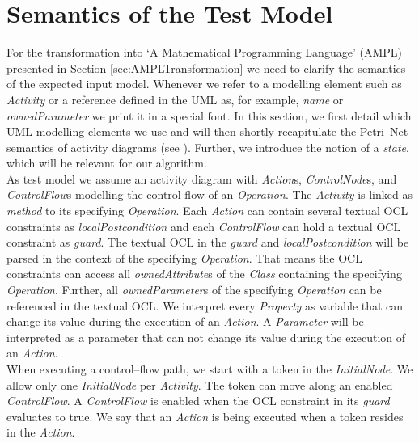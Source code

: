 \documentclass[runningheads,a4paper]{llncs}%
\newcommand{\UMLType}[1]{\textsf{\textit{#1}}} %
\newcommand{\UMLReference}[1]{\textsf{\textit{#1}}} %
\begin{document}
\section{Semantics of the Test Model}%
\label{sec:TestModel}%
For the transformation into `A Mathematical Programming Language' (AMPL) presented in Section \ref{sec:AMPLTransformation} we need to clarify the semantics of the expected input model. Whenever we refer to a modelling element such as \UMLType{Activity} or a reference defined in the UML as, for example, \UMLReference{name} or \UMLReference{ownedParameter} we print it in a special font. In this section, we first %
detail which UML modelling elements we use and will then shortly recapitulate the Petri--Net semantics of activity diagrams (see \cite{UML23Superstructure}). Further, we introduce the notion of a \emph{state}, which will be relevant for our algorithm.\\%
As test model we assume an activity diagram with \UMLType{Action}s, \UMLType{ControlNode}s, and \UMLType{ControlFlow}s modelling the control flow of an \UMLType{Operation}. The \UMLType{Activity} is linked as \UMLReference{method} to its specifying \UMLType{Operation}. Each \UMLType{Action} can contain several textual OCL constraints as \UMLReference{localPostcondition} and each \UMLType{ControlFlow} can hold a textual OCL constraint as \UMLReference{guard}. The textual OCL in the \UMLReference{guard} and \UMLReference{localPostcondition} will be parsed in the context of the specifying \UMLType{Operation}. That means the OCL constraints can access all \UMLReference{ownedAttribute}s of the \UMLType{Class} containing the specifying \UMLType{Operation}. Further, all \UMLReference{ownedParameter}s of the specifying \UMLType{Operation} can be referenced in the textual OCL. We interpret every \UMLType{Property} as variable that can change its value during the execution of an \UMLType{Action}. A \UMLType{Parameter} will be interpreted as a parameter that can not change its value during the execution of an \UMLType{Action}.\\%
When executing a control--flow path, we start with a token in the \UMLType{InitialNode}. We allow only one \UMLType{InitialNode} per \UMLType{Activity}. The token can move along an enabled \UMLType{ControlFlow}. A \UMLType{ControlFlow} is enabled when the OCL constraint in its \UMLReference{guard} evaluates to true. We say that an \UMLType{Action} is being executed when a token resides in the \UMLType{Action}.\\%
\end{document}
